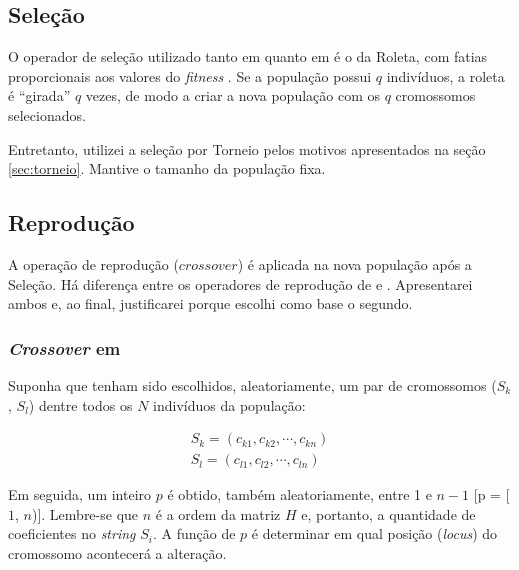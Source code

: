 \subsection{Seleção}

			O operador de seleção utilizado tanto em \cite{metodo2004} quanto em \cite{metodo2011} é o da Roleta, com fatias proporcionais aos valores do \emph{fitness} \cite{Linden2008}. Se a população possui $q$ indivíduos, a roleta é ``girada'' $q$ vezes, de modo a criar a nova população com os $q$ cromossomos selecionados.
			
			Entretanto, utilizei a seleção por Torneio pelos motivos apresentados na seção \ref{sec:torneio}. Mantive o tamanho da população fixa.
									
\subsection{Reprodução}

	A operação de reprodução ($crossover$) é aplicada na nova população após a Seleção. Há diferença entre os operadores de reprodução de \cite{metodo2004} e \cite{metodo2011}. Apresentarei ambos e, ao final, justificarei porque escolhi como base o segundo.

\subsubsection{\emph{Crossover} em \cite{metodo2004}}
	
	Suponha que tenham sido escolhidos, aleatoriamente, um par de cromossomos ($S_k$, $S_l$) dentre todos os $N$ indivíduos da população:
	
	\begin{equation}
		\begin{array}{l}
			S_k = (c_{k1}, c_{k2}, \cdots, c_{kn})	\\
			S_l = (c_{l1}, c_{l2}, \cdots, c_{ln})	
		\end{array}
	\end{equation}

	Em seguida, um inteiro $p$ é obtido, também aleatoriamente, entre 1 e $n - 1$ [p = [$1$, $n$)]. Lembre-se que $n$ é a ordem da matriz $H$ e, portanto, a quantidade de coeficientes no \emph{string} $S_i$. A função de $p$ é determinar em qual posição (\emph{locus}) do cromossomo acontecerá a alteração.
	
